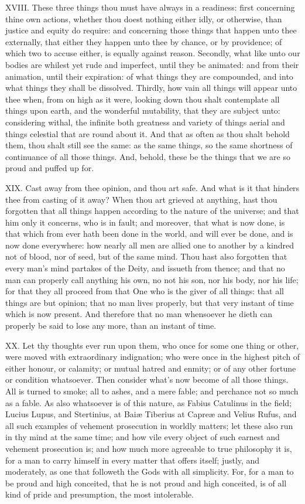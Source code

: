 XVIII. These three things thou must have always in a readiness: first
concerning thine own actions, whether thou doest nothing either idly, or
otherwise, than justice and equity do require: and concerning those things
that happen unto thee externally, that either they happen unto thee by
chance, or by providence; of which two to accuse either, is equally
against reason. Secondly, what like unto our bodies are whilest yet rude
and imperfect, until they be animated: and from their animation, until
their expiration: of what things they are compounded, and into what things
they shall be dissolved. Thirdly, how vain all things will appear unto
thee when, from on high as it were, looking down thou shalt contemplate
all things upon earth, and the wonderful mutability, that they are subject
unto: considering withal, the infinite both greatness and variety of
things aerial and things celestial that are round about it. And that as
often as thou shalt behold them, thou shalt still see the same: as the
same things, so the same shortness of continuance of all those things.
And, behold, these be the things that we are so proud and puffed up for.

XIX. Cast away from thee opinion, and thou art safe. And what is it that
hinders thee from casting of it away? When thou art grieved at anything,
hast thou forgotten that all things happen according to the nature of the
universe; and that him only it concerns, who is in fault; and moreover,
that what is now done, is that which from ever hath been done in the
world, and will ever be done, and is now done everywhere: how nearly all
men are allied one to another by a kindred not of blood, nor of seed, but
of the same mind. Thou hast also forgotten that every man's mind partakes
of the Deity, and issueth from thence; and that no man can properly call
anything his own, no not his son, nor his body, nor his life; for that
they all proceed from that One who is the giver of all things: that all
things are but opinion; that no man lives properly, but that very instant
of time which is now present. And therefore that no man whensoever he
dieth can properly be said to lose any more, than an instant of time.

XX. Let thy thoughts ever run upon them, who once for some one thing or
other, were moved with extraordinary indignation; who were once in the
highest pitch of either honour, or calamity; or mutual hatred and enmity;
or of any other fortune or condition whatsoever. Then consider what's now
become of all those things. All is turned to smoke; all to ashes, and a
mere fable; and perchance not so much as a fable. As also whatsoever is of
this nature, as Fabius Catulinus in the field; Lucius Lupus, and
Stertinius, at Baiæ Tiberius at Capreæ and Velius Rufus, and all such
examples of vehement prosecution in worldly matters; let these also run in
thy mind at the same time; and how vile every object of such earnest and
vehement prosecution is; and how much more agreeable to true philosophy it
is, for a man to carry himself in every matter that offers itself; justly,
and moderately, as one that followeth the Gods with all simplicity. For,
for a man to be proud and high conceited, that he is not proud and high
conceited, is of all kind of pride and presumption, the most intolerable.

